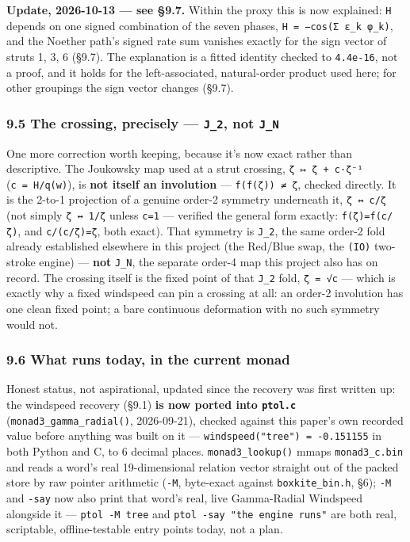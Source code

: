 \documentclass[
  10pt,
]{article}
\begin{document}
\textbf{Update, 2026-10-13 --- see §9.7.} Within the proxy this is now
explained: \texttt{H} depends on one signed combination of the seven
phases, \texttt{H\ =\ −cos(Σ\ ε\_k\ φ\_k)}, and the Noether path's
signed rate sum vanishes exactly for the sign vector of struts 1, 3, 6
(§9.7). The explanation is a fitted identity checked to
\texttt{4.4e-16}, not a proof, and it holds for the left-associated,
natural-order product used here; for other groupings the sign vector
changes (§9.7).

\hypertarget{the-crossing-precisely-j_2-not-j_n}{%
\subsubsection{\texorpdfstring{9.5 The crossing, precisely ---
\texttt{J\_2}, not
\texttt{J\_N}}{9.5 The crossing, precisely --- J\_2, not J\_N}}\label{the-crossing-precisely-j_2-not-j_n}}

One more correction worth keeping, because it's now exact rather than
descriptive. The Joukowsky map used at a strut crossing,
\texttt{ζ\ ↦\ ζ\ +\ c·ζ⁻¹} (\texttt{c\ =\ H/q(w)}), is \textbf{not
itself an involution} --- \texttt{f(f(ζ))\ ≠\ ζ}, checked directly. It
is the 2-to-1 projection of a genuine order-2 symmetry underneath it,
\texttt{ζ\ ↔\ c/ζ} (not simply \texttt{ζ\ ↔\ 1/ζ} unless \texttt{c=1}
--- verified the general form exactly: \texttt{f(ζ)=f(c/ζ)}, and
\texttt{c/(c/ζ)=ζ}, both exact). That symmetry is \texttt{J\_2}, the
same order-2 fold already established elsewhere in this project (the
Red/Blue swap, the \texttt{(I\textbar{}O)} two-stroke engine) ---
\textbf{not} \texttt{J\_N}, the separate order-4 map this project also
has on record. The crossing itself is the fixed point of that
\texttt{J\_2} fold, \texttt{ζ\ =\ √c} --- which is exactly why a fixed
windspeed can pin a crossing at all: an order-2 involution has one clean
fixed point; a bare continuous deformation with no such symmetry would
not.

\hypertarget{what-runs-today-in-the-current-monad}{%
\subsubsection{9.6 What runs today, in the current
monad}\label{what-runs-today-in-the-current-monad}}

Honest status, not aspirational, updated since the recovery was first
written up: the windspeed recovery (§9.1) \textbf{is now ported into
\texttt{ptol.c}} (\texttt{monad3\_gamma\_radial()}, 2026-09-21), checked
against this paper's own recorded value before anything was built on it
--- \texttt{windspeed("tree")\ =\ -0.151155} in both Python and C, to 6
decimal places. \texttt{monad3\_lookup()} mmaps \texttt{monad3\_c.bin}
and reads a word's real 19-dimensional relation vector straight out of
the packed store by raw pointer arithmetic (\texttt{-M}, byte-exact
against \texttt{boxkite\_bin.h}, §6); \texttt{-M} and \texttt{-say} now
also print that word's real, live Gamma-Radial Windspeed alongside it
--- \texttt{ptol\ -M\ tree} and \texttt{ptol\ -say\ "the\ engine\ runs"}
are both real, scriptable, offline-testable entry points today, not a
plan.
\end{document}
